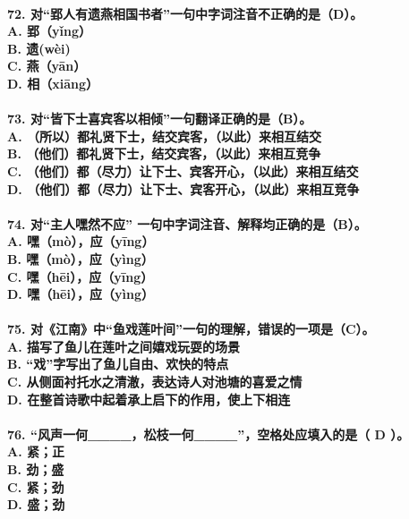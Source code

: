 \documentclass[UTF8]{ctexart} %
\begin{document}
\paragraph{
72. 对“郢人有遗燕相国书者”一句中字词注音不正确的是（\color{red}D\color{black}）。 \\
    A. 郢（yǐng） \\
    B. 遗(wèi) \\
    C. 燕（yān） \\
    D. 相（xiāng）
}
\paragraph{
73. 对“皆下士喜宾客以相倾”一句翻译正确的是（\color{red}B\color{black}）。 \\
    A. （所以）都礼贤下士，结交宾客，（以此）来相互结交 \\
    B. （他们）都礼贤下士，结交宾客，（以此）来相互竞争 \\
    C. （他们）都（尽力）让下士、宾客开心，（以此）来相互结交 \\
    D. （他们）都（尽力）让下士、宾客开心，（以此）来相互竞争
}
\paragraph{
74. 对“主人嘿然不应” 一句中字词注音、解释均正确的是（\color{red}B\color{black}）。 \\
    A. 嘿（mò），应（yīng） \\
    B. 嘿（mò），应（yìng） \\
    C. 嘿（hēi），应（yīng） \\
    D. 嘿（hēi），应（yìng）
}
\paragraph{
75. 对《江南》中“鱼戏莲叶间”一句的理解，错误的一项是（\color{red}C\color{black}）。 \\
    A. 描写了鱼儿在莲叶之间嬉戏玩耍的场景 \\
    B. “戏”字写出了鱼儿自由、欢快的特点 \\
    C. 从侧面衬托水之清澈，表达诗人对池塘的喜爱之情 \\
    D. 在整首诗歌中起着承上启下的作用，使上下相连
}
\paragraph{
76. “风声一何\_\_\_\_，松枝一何\_\_\_\_”，空格处应填入的是（ \color{red}D\color{black}  ）。 \\
    A. 紧；正 \\
    B. 劲；盛 \\
    C. 紧；劲 \\
    D. 盛；劲
}
\end{document}

